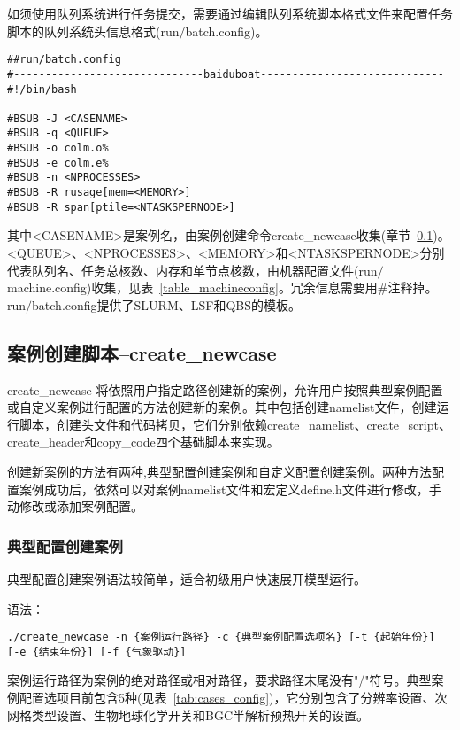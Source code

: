 \documentclass[a4paper,12pt,twoside]{article}
\begin{document}
如须使用队列系统进行任务提交，需要通过编辑队列系统脚本格式文件来配置任务脚本的队列系统头信息格式(run$\slash$batch.config)。

\begin{lstlisting}
##run/batch.config
#------------------------------baiduboat-----------------------------
#!/bin/bash

#BSUB -J <CASENAME>
#BSUB -q <QUEUE>
#BSUB -o colm.o%
#BSUB -e colm.e%
#BSUB -n <NPROCESSES>
#BSUB -R rusage[mem=<MEMORY>]
#BSUB -R span[ptile=<NTASKSPERNODE>]
\end{lstlisting}

其中<CASENAME>是案例名，由案例创建命令create\_newcase收集(章节~\ref{CreateNewcase})。<QUEUE>、<NPROCESSES>、<MEMORY>和<NTASKSPERNODE>分别代表队列名、任务总核数、内存和单节点核数，由机器配置文件(run$\slash$machine.config)收集，见表~\ref{table_machineconfig}。冗余信息需要用\#注释掉。run$\slash$batch.config提供了SLURM、LSF和QBS的模板。

\subsection{案例创建脚本--create\_newcase} \label{CreateNewcase}
create\_newcase 将依照用户指定路径创建新的案例，允许用户按照典型案例配置或自定义案例进行配置的方法创建新的案例。其中包括创建namelist文件，创建运行脚本，创建头文件和代码拷贝，它们分别依赖create\_namelist、create\_script、create\_header和copy\_code四个基础脚本来实现。

创建新案例的方法有两种,典型配置创建案例和自定义配置创建案例。两种方法配置案例成功后，依然可以对案例namelist文件和宏定义define.h文件进行修改，手动修改或添加案例配置。

\subsubsection{典型配置创建案例}

典型配置创建案例语法较简单，适合初级用户快速展开模型运行。

语法：

\begin{lstlisting}
./create_newcase -n {案例运行路径} -c {典型案例配置选项名} [-t {起始年份}] [-e {结束年份}] [-f {气象驱动}]
\end{lstlisting}

案例运行路径为案例的绝对路径或相对路径，要求路径末尾没有"/"符号。典型案例配置选项目前包含5种(见表~\ref{tab:cases_config})，它分别包含了分辨率设置、次网格类型设置、生物地球化学开关和BGC半解析预热开关的设置。
\end{document}
